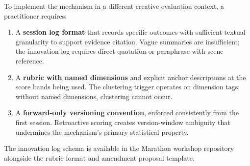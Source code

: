 To implement the mechanism in a different creative evaluation context, a
practitioner requires:

\begin{enumerate}
  \item A \textbf{session log format} that records specific outcomes with
        sufficient textual granularity to support evidence citation. Vague
        summaries are insufficient; the innovation log requires direct quotation
        or paraphrase with scene reference.
  \item A \textbf{rubric with named dimensions} and explicit anchor descriptions
        at the score bands being used. The clustering trigger operates on
        dimension tags; without named dimensions, clustering cannot occur.
  \item A \textbf{forward-only versioning convention}, enforced consistently
        from the first session. Retroactive scoring creates version-window
        ambiguity that undermines the mechanism's primary statistical property.
\end{enumerate}

The innovation log schema is available in the Marathon workshop repository
alongside the rubric format and amendment proposal template.
